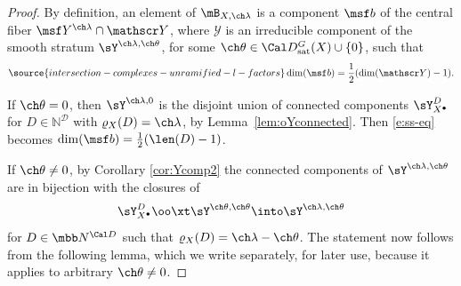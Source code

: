 \begin{proof}
By definition, an element of $\mB_{X,\ch\lambda}$ is a component $\msf b$ of the central fiber $\msf Y^{\ch\lambda}\cap \mathscr Y$, where $\mathscr Y$ is an irreducible component of the smooth stratum $\sY^{\ch\lambda,\ch\theta}$, for some $\ch\theta \in \Cal D^G_{\mathrm{sat}}(X)\cup\{0\}$, such that
\begin{equation} \label{e:ss-eq}
\source{intersection-complexes-unramified-l-factors}
    \dim (\msf b) = \frac 1 2 ( \dim (\mathscr Y) -1).
\end{equation}

If $\ch\theta=0$, then $\sY^{\ch\lambda,0}$ is the disjoint union of
connected components $\sY^D_{X^\bullet}$
for $D\in \mathbb N^{\mathcal D}$ with $\varrho_X(D) =\ch\lambda$, by Lemma~\ref{lem:oYconnected}.
Then
\eqref{e:ss-eq} becomes $\dim(\msf b)
= \frac 1 2 (\len(D)-1) $.

If $\ch\theta \ne 0$, by Corollary \ref{cor:Ycomp2} the connected components of $\sY^{\ch\lambda,\ch\theta}$ are
in bijection with the closures of
\[ \sY^{D}_{X^\bullet} \oo\xt \sY^{\ch\theta,\ch\theta} \into \sY^{\ch\lambda,\ch\theta} \]
for $D\in \mbb N^{\Cal D}$ such that $\varrho_X(D) = \ch\lambda-\ch\theta$. The statement now follows from the following lemma, which we write separately, for later use, because it applies to arbitrary $\ch\theta \ne 0$.







\end{proof}


